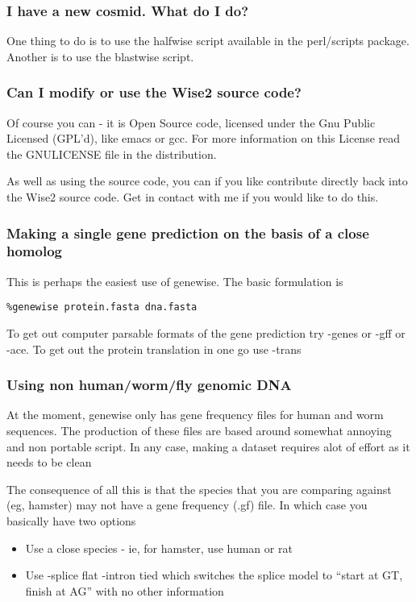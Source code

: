 \documentclass{article}
\begin{document}
\subsubsection{I have a new cosmid. What do I do?}

One thing to do is to use the halfwise script available in the perl/scripts
package. Another is to use the blastwise script. 


\subsubsection{Can I modify or use the Wise2 source code?}

Of course you can - it is Open Source code, licensed under the Gnu
Public Licensed (GPL'd), like emacs or gcc. For more information on
this License read the GNULICENSE file in the distribution. 

As well as using the source code, you can if you like contribute
directly back into the Wise2 source code. Get in contact with me
if you would like to do this.

\subsubsection{Making a single gene prediction on the basis of a close homolog}

This is perhaps the easiest use of genewise. The basic formulation is
\begin{verbatim}
%genewise protein.fasta dna.fasta
\end{verbatim}
To get out computer parsable formats of the gene prediction
try -genes or -gff or -ace. To get out the protein translation 
in one go use -trans
\subsubsection{Using non human/worm/fly genomic DNA}

At the moment, genewise only has gene frequency files for
human and worm sequences. The production of these files
are based around somewhat annoying and non portable script. In
any case, making a dataset requires alot of effort as it
needs to be clean

The consequence of all this is that the species that you
are comparing against (eg, hamster) may not have a gene frequency
(.gf) file. In which case you basically have two options
\begin{itemize}
\item Use a close species - ie, for hamster, use human or rat
\item Use -splice flat -intron tied which switches the splice model to ``start at GT, finish at AG'' with no other information
\end{itemize}
\end{document}
